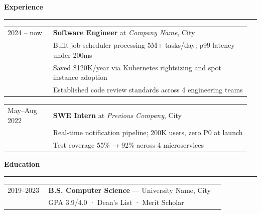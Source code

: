 \documentclass[a4paper]{article}
\begin{document}
\vspace{12pt}
\hspace{20pt}
\begin{minipage}{\dimexpr\textwidth-40pt}

{\color{accentblue}\large\textbf{Experience}}\\[-2pt]
{\color{accentblue}\rule{\linewidth}{0.5pt}}

\vspace{6pt}
\noindent\begin{tabular}{@{}p{0.18\linewidth}p{0.78\linewidth}}
{\footnotesize\color{gray} 2024 -- now} &
\textbf{Software Engineer} at \textit{Company Name}, City\\
& \footnotesize Built job scheduler processing 5M+ tasks/day; p99 latency under 200ms \\
& \footnotesize Saved \$120K/year via Kubernetes rightsizing and spot instance adoption \\
& \footnotesize Established code review standards across 4 engineering teams \\
\end{tabular}

\vspace{6pt}
\noindent\begin{tabular}{@{}p{0.18\linewidth}p{0.78\linewidth}}
{\footnotesize\color{gray} May--Aug 2022} &
\textbf{SWE Intern} at \textit{Previous Company}, City\\
& \footnotesize Real-time notification pipeline; 200K users, zero P0 at launch \\
& \footnotesize Test coverage 55\% → 92\% across 4 microservices \\
\end{tabular}

\vspace{10pt}
{\color{accentblue}\large\textbf{Education}}\\[-2pt]
{\color{accentblue}\rule{\linewidth}{0.5pt}}

\vspace{6pt}
\noindent\begin{tabular}{@{}p{0.18\linewidth}p{0.78\linewidth}}
{\footnotesize\color{gray} 2019--2023} &
\textbf{B.S. Computer Science} — University Name, City \\
& \footnotesize GPA 3.9/4.0 · Dean's List · Merit Scholar \\
\end{tabular}


\end{minipage}
\end{document}
